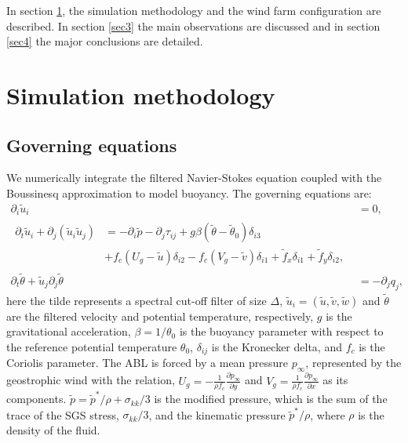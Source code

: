 \documentclass[%
 aip,
 amsmath,amssymb,
reprint,
twocolumn,%
author-numerical,%
]{revtex4-1}
\begin{document}
In section \ref{sec2}, the simulation methodology and the wind farm configuration are described. In section \ref{sec3} the main observations are discussed and in section \ref{sec4} the major conclusions are detailed. 
\section{Simulation methodology}\label{sec2}

\subsection{Governing equations}\label{sec2.1}
We numerically integrate the filtered Navier-Stokes equation coupled with the Boussinesq approximation to model buoyancy. The governing equations are: 
%
\begin{align}
 \partial_{\mathit{i}} \widetilde{u}_\mathit{i}&=0,\label{eqn1}\\
 \begin{split}
 \partial_{\mathit{t}}\widetilde{u}_\mathit{i} + \partial_\mathit{j}\left(\widetilde{u}_\mathit{i}\widetilde{u}_\mathit{j}\right)&=-\partial_{\mathit{i}}\widetilde{p}-\partial_\mathit{j}\tau_{\mathit{ij}} + g\beta(\widetilde{\theta}-\widetilde{\theta}_\mathit{0})\delta_{\mathit{i3}}\\&+f_c(U_g-\widetilde{u})\delta_{i2}-f_c(V_g-\widetilde{v})\delta_{i1}+ \widetilde{f}_x\delta_{i1}+ \widetilde{f}_y\delta_{i2},
 \end{split}\label{eqn2}\\
 \partial_{\mathit{t}}\widetilde{\theta} + \widetilde{u}_\mathit{j}\partial_{\mathit{j}}\widetilde{\theta}&=-\partial_{\mathit{j}}q_\mathit{j},\label{eqn3}
\end{align}
%
here the tilde represents a spectral cut-off filter of size $\Delta$, $\widetilde{u}_\mathit{i}=\left(\widetilde{u},\widetilde{v},\widetilde{w}\right)$ and $\widetilde{\theta}$ are the filtered velocity and potential temperature, respectively, $g$ is the gravitational acceleration, $\beta=1/\theta_\mathit{0}$ is the buoyancy parameter with respect to the reference potential temperature $\theta_\mathit{0}$, $\delta_{\mathit{ij}}$ is the Kronecker delta, and $f_c$ is the Coriolis parameter. The ABL is forced by a mean pressure $p_\infty$, represented by the geostrophic wind with the relation, $U_g=-\frac{1}{{\rho}f_c}\frac{\partial{p_{\infty}}}{\partial{y}}$ and $V_g=\frac{1}{{\rho}f_c}\frac{\partial{p_{\infty}}}{\partial{x}}$ as its components. $\widetilde{p}=\widetilde{p}^{*}/\rho+\sigma_{kk}/3$ is the modified pressure, which is the sum of the trace of the SGS stress, $\sigma_{kk}/3$, and the kinematic pressure $\widetilde{p}^{*}/\rho$, where $\rho$ is the density of the fluid. 
\end{document}

